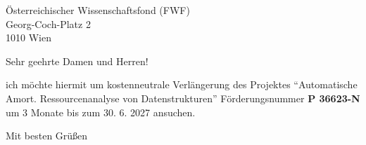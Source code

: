 \documentclass[paper=a4,
fontsize=11pt,
fromalign=right,
fromrule=true,
fromphone=false,
fromemail=true,
fromlogo=true,
backaddress=false,
parskip=true,
subject=untitled,
addrfield=true,
]{scrlttr2}
\begin{document}
\begin{letter}{%
    Österreichischer Wissenschaftsfond (FWF)\\
    \vspace*{0.25cm}
    Georg-Coch-Platz 2\\
    1010 Wien
}



\opening{Sehr geehrte Damen und Herren!}

ich möchte hiermit um kostenneutrale Verlängerung des Projektes \enquote{Automatische Amort. Ressourcenanalyse von Datenstrukturen}
Förderungsnummer \textbf{P 36623-N} um 3 Monate bis zum 30. 6. 2027 ansuchen. 

\closing{Mit besten Grüßen}

\smallskip

\end{letter}
\end{document}
